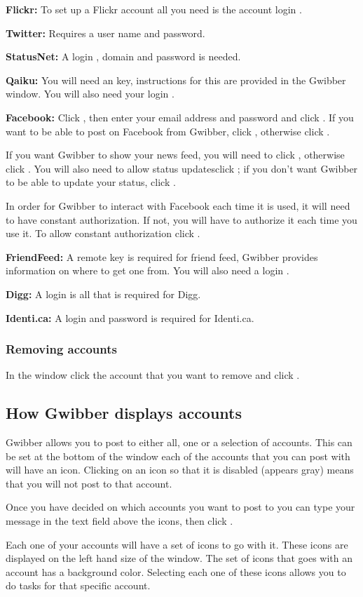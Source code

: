  \textbf{Flickr:} To set up a Flickr account all you need is the account login .

\textbf{Twitter:} Requires a user name and password.

\textbf{StatusNet:} A login , domain and password is needed.

\textbf{Qaiku:} You will need an  key, instructions for this are provided in the 
Gwibber window. You will also need your login .


\textbf{Facebook:} Click , then enter your email address and
password and click . If you want to be able to post on Facebook
from Gwibber, click , otherwise click .

If you want Gwibber to show your news feed, you will need to click , otherwise click . You will also need to allow
status updates\dash click ; if you don't want Gwibber
to be able to update your status, click .

In order for Gwibber to interact with Facebook each time it is used, it will
need to have constant authorization. If not, you will have to authorize it each
time you use it. To allow constant authorization click .

\textbf{FriendFeed:} A remote key is required for friend feed, Gwibber provides information 
on where to get one from. You will also need a login .

\textbf{Digg:} A login  is all that is required for Digg.

\textbf{Identi.ca:} A login  and password is required for Identi.ca.

\subsubsection{Removing accounts}

In the  window click the account that you want to remove 
and click . 

\subsection{How Gwibber displays accounts}

Gwibber allows you to post to either all, one or a selection of accounts. This can 
be set at the bottom of the  window \dash each of the 
accounts that you can post with will have an icon. Clicking on an icon so that it is 
disabled (appears gray) means that you will not post to that account.

Once you have decided on which accounts you want to post to you can type your message in the 
text field above the icons, then click .

Each one of your accounts will have a set of icons to go with it. These icons are displayed
on the left hand size of the  window. The set of icons
that goes with an account has a background color. Selecting each one of these icons allows you to do
tasks for that specific account.
